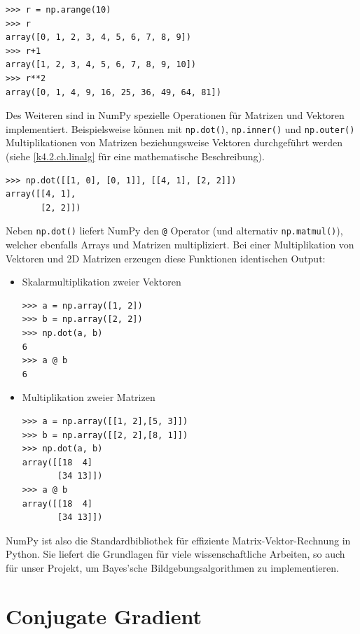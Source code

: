 \documentclass[]{dsadokumentation}
\begin{document}
\begin{verbatim}
>>> r = np.arange(10)
>>> r
array([0, 1, 2, 3, 4, 5, 6, 7, 8, 9])
>>> r+1
array([1, 2, 3, 4, 5, 6, 7, 8, 9, 10])
>>> r**2
array([0, 1, 4, 9, 16, 25, 36, 49, 64, 81])
\end{verbatim}

Des Weiteren sind in NumPy spezielle Operationen für Matrizen und Vektoren implementiert. Beispielsweise können mit \verb|np.dot()|, \verb|np.inner()| und \verb|np.outer()| Multiplikationen von Matrizen beziehungsweise Vektoren durchgeführt werden (siehe \cref{k4.2.ch.linalg} für eine mathematische Beschreibung).

\begin{verbatim}
>>> np.dot([[1, 0], [0, 1]], [[4, 1], [2, 2]])
array([[4, 1],
       [2, 2]])
\end{verbatim}

Neben \verb|np.dot()| liefert NumPy den \verb|@| Operator (und alternativ \verb|np.matmul()|), welcher ebenfalls Arrays und Matrizen multipliziert.
Bei einer Multiplikation von Vektoren und 2D Matrizen erzeugen diese Funktionen identischen Output:

\begin{itemize}
    \item Skalarmultiplikation zweier Vektoren

        \begin{verbatim}
>>> a = np.array([1, 2])
>>> b = np.array([2, 2])
>>> np.dot(a, b)
6
>>> a @ b
6
\end{verbatim}

  \item Multiplikation zweier Matrizen

        \begin{verbatim}
>>> a = np.array([[1, 2],[5, 3]])
>>> b = np.array([[2, 2],[8, 1]])
>>> np.dot(a, b)
array([[18  4]
       [34 13]])
>>> a @ b
array([[18  4]
       [34 13]])
\end{verbatim}

\end{itemize}

NumPy ist also die Standardbibliothek für effiziente Matrix-Vektor-Rechnung in Python. Sie liefert die Grundlagen für viele wissenschaftliche Arbeiten, so auch für unser Projekt, um Bayes'sche Bildgebungsalgorithmen zu implementieren.

\section{Conjugate Gradient}
\end{document}

